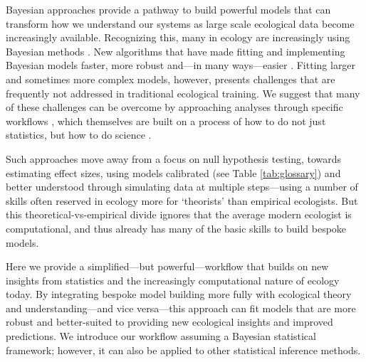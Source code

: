\documentclass[11pt]{article}
\begin{document}
Bayesian approaches provide a pathway to build powerful models that can transform how we understand our systems as large scale ecological data become increasingly available. Recognizing this, many in ecology are increasingly using Bayesian methods \citep{anderson2021trends}. New algorithms \citep[e.g. Hamiltonian Monte Carlo,][]{nuts2014,betan2019} that have made fitting and implementing Bayesian models faster, more robust and---in many ways---easier \citep{Carpenter:2017stan}. Fitting larger and sometimes more complex models, however, presents challenges that are frequently not addressed in traditional ecological training. We suggest that many of these challenges can be overcome by approaching analyses through specific workflows \citep{betanworkflow,grinsztajn2021,vandeschoot2021}, which themselves are built on a process of how to do not just statistics, but how to do science \citep{box1976science}. 

Such approaches move away from a focus on null hypothesis testing, towards estimating effect sizes, using models calibrated (see Table \ref{tab:glossary}) and better understood through simulating data at multiple steps---using a number of skills often reserved in ecology more for `theorists' than empirical ecologists.  But this theoretical-vs-empirical divide ignores that the average modern ecologist is computational, and thus already has many of the basic skills to build bespoke models. 

Here we provide a simplified---but powerful---workflow that builds on new insights from statistics  \citep{betanworkflow,vandeschoot2021} and the increasingly computational nature of ecology today. By integrating bespoke model building more fully with ecological theory and understanding---and vice versa---this approach can fit models that are more robust and better-suited to providing new ecological insights and improved predictions. We introduce our workflow assuming a Bayesian statistical framework; however, it can also be applied to other statistical inference methods. %
\end{document}
